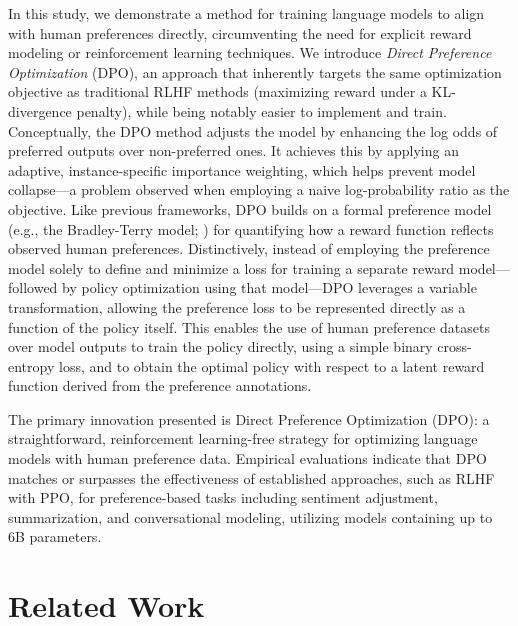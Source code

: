 In this study, we demonstrate a method for training language models to align with human preferences directly, circumventing the need for explicit reward modeling or reinforcement learning techniques. We introduce \textit{Direct Preference Optimization} (DPO), an approach that inherently targets the same optimization objective as traditional RLHF methods (maximizing reward under a KL-divergence penalty), while being notably easier to implement and train. Conceptually, the DPO method adjusts the model by enhancing the log odds of preferred outputs over non-preferred ones. It achieves this by applying an adaptive, instance-specific importance weighting, which helps prevent model collapse—a problem observed when employing a naive log-probability ratio as the objective. Like previous frameworks, DPO builds on a formal preference model (e.g., the Bradley-Terry model; \cite{bradley1952rankanalysis}) for quantifying how a reward function reflects observed human preferences. Distinctively, instead of employing the preference model solely to define and minimize a loss for training a separate reward model—followed by policy optimization using that model—DPO leverages a variable transformation, allowing the preference loss to be represented directly as a function of the policy itself. This enables the use of human preference datasets over model outputs to train the policy directly, using a simple binary cross-entropy loss, and to obtain the optimal policy with respect to a latent reward function derived from the preference annotations.

The primary innovation presented is Direct Preference Optimization (DPO): a straightforward, reinforcement learning-free strategy for optimizing language models with human preference data. Empirical evaluations indicate that DPO matches or surpasses the effectiveness of established approaches, such as RLHF with PPO, for preference-based tasks including sentiment adjustment, summarization, and conversational modeling, utilizing models containing up to 6B parameters.

\section{Related Work}

